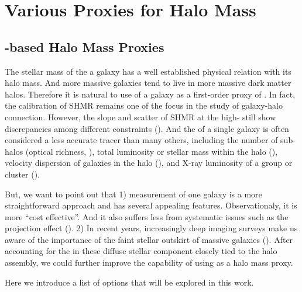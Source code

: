 \documentclass[a4paper,fleqn,usenatbib]{mnras}
\begin{document}

\section{Various Proxies for Halo Mass}

\subsection{\mstar{}-based Halo Mass Proxies}
    \label{sec:proxy_mstar}

    The stellar mass of the a galaxy has a well established physical relation with its halo mass.
    And more massive galaxies tend to live in more massive dark matter halos.
    Therefore it is natural to use \mstar{} of a galaxy as a first-order proxy of \mvir{}.
    In fact, the calibration of SHMR remains one of the focus in the study of galaxy-halo connection.
    However, the slope and scatter of SHMR at the high-\mstar{} still show discrepancies among
    different constraints (\addref{}).
    And the \mstar{} of a single galaxy is often considered a less accurate \mvir{} tracer
    than many others, including the number of sub-halos (optical richness, \addref{}),
    total luminosity or stellar mass within the halo (\addref{}), velocity dispersion of galaxies
    in the halo (\addref{}), and X-ray luminosity of a group or cluster (\addref{}).

    But, we want to point out that
    1) \mstar{} measurement of one galaxy is a more straightforward approach and has several
    appealing features. Observationaly, it is more ``cost effective''. And it also suffers less
    from systematic issues such as the projection effect (\addref{}).
    2) In recent years, increasingly deep imaging surveys make us aware of the importance of the
    faint stellar outskirt of massive galaxies (\addref{}).
    After accounting for the \mstar{} in these diffuse stellar component closely tied to the
    halo assembly, we could further improve the capability of using \mstar{} as a halo mass proxy.

    Here we introduce a list of \mstar{} options that will be explored in this work.

\end{document}
